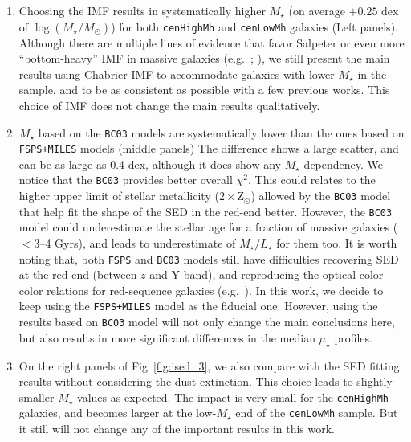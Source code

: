 \documentclass[a4paper,fleqn,usenatbib]{mnras}
\def\rbcg{\texttt{cenHighMh}}
\def\nbcg{\texttt{cenLowMh}}
\def\mstar{{$M_{\star}$}}
\def\logms{{$\log (M_{\star}/M_{\odot})$}}
\def\m2l{{$M_{\star}/L_{\star}$}}
\def\mden{{$\mu_{\star}$}}
\begin{document}
    \begin{enumerate}

        \item Choosing the \citet{Salpeter1955} IMF results in systematically 
            higher \mstar{} (on average $+0.25$ dex of \logms{}) for both \rbcg{}
            and \nbcg{} galaxies (Left panels).
            Although there are multiple lines of evidence that favor Salpeter 
            or even more ``bottom-heavy'' IMF in massive galaxies 
            (e.g.\ \citealt{Conroy2012}; \citealt{Cappellari2012}), we still 
            present the main results using Chabrier IMF to accommodate galaxies 
            with lower \mstar{} in the sample, and to be as consistent as possible 
            with a few previous works.  
            This choice of IMF does not change the main results qualitatively. 

        \item \mstar{} based on the \texttt{BC03} models are systematically lower 
            than the ones based on \texttt{FSPS+MILES} models (middle panels)
            The difference shows a large scatter, and can be as large as 0.4 dex,
            although it does show any \mstar{} dependency. 
            We notice that the \texttt{BC03} provides better overall ${\chi}^2$. 
            This could relates to the higher upper limit of stellar metallicity 
            ($2 \times \mathrm{Z}_{\odot}$) allowed by the \texttt{BC03} model 
            that help fit the shape of the SED in the red-end better.  
            However, the \texttt{BC03} model could underestimate the 
            stellar age for a fraction of massive galaxies ($< 3$--4 Gyrs), and 
            leads to underestimate of  \m2l{} for them too.
            It is worth noting that, both \texttt{FSPS} and \texttt{BC03} 
            models still have difficulties recovering SED at the red-end (between $z$ 
            and Y-band), and reproducing the optical color-color relations for 
            red-sequence galaxies (e.g.\ \citealt{MIUSCAT2}).
            In this work, we decide to keep using the \texttt{FSPS+MILES} model as 
            the fiducial one.  
            However, using the results based on \texttt{BC03} model will not 
            only change the main conclusions here, but also results in more 
            significant differences in the median \mden{} profiles.
            
        \item On the right panels of Fig~\ref{fig:ised_3}, we also compare with the
            SED fitting results without considering the dust extinction. 
            This choice leads to slightly smaller \mstar{} values as expected. 
            The impact is very small for the \rbcg{} galaxies, and becomes larger 
            at the low-\mstar{} end of the \nbcg{} sample. 
            But it still will not change any of the important results in this work.
          
    \end{enumerate}
\end{document}
